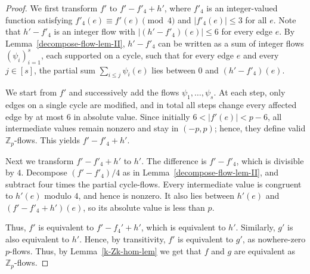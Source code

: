 \documentclass[a4paper,12pt]{article}
\theoremstyle{plain}
\theoremstyle{definition}
\newcommand{\Z}{\mathbb{Z}}
\renewcommand\le\leqslant
\begin{document}
\begin{proof}
We first transform $f'$ to $f'-f'_4+h'$, where $f'_4$ is an integer-valued function satisfying $f'_4(e)\equiv f'(e)\pmod 4$ and $|f'_4(e)|\le 3$ for all $e$. Note that $h'-f'_4$ is an integer flow with $|(h'-f'_4)(e)|\le 6$ for every edge $e$.
%
By Lemma~\ref{decompose-flow-lem-II}, $h'-f'_4$ can be written as a sum of integer flows $(\psi_i)_{i=1}^s$, each supported on a cycle, such that for every edge $e$ and every $j\in[s]$, the partial sum $\sum_{i\le j}\psi_i(e)$ lies between $0$ and $(h'-f'_4)(e)$.

We start from $f'$ and successively add the flows $\psi_1,\ldots,\psi_s$. At each step, only edges on a single cycle are modified, and in total all steps change every affected edge by at most $6$ in absolute value. Since initially $6<|f'(e)|<p-6$, all intermediate values remain nonzero and stay in $(-p,p)$; hence, they define valid $\mathbb{Z}_p$-flows. This yields $f'-f'_4+h'$.

Next we transform $f'-f'_4+h'$ to $h'$.  The difference is $f'-f'_4$, which is divisible by $4$.  Decompose $(f'-f'_4)/4$ as in Lemma~\ref{decompose-flow-lem-II}, and subtract four times the partial cycle-flows.  Every intermediate value is congruent to $h'(e)$ modulo $4$, and hence is nonzero.  It also lies between $h'(e)$ and $(f'-f'_4+h')(e)$, so its absolute value is less than $p$.

Thus, $f'$ is equivalent to $f'-f_4'+h'$, which is equivalent to $h'$.  Similarly, $g'$ is also equivalent to $h'$.  Hence, by transitivity, $f'$ is equivalent to $g'$, as nowhere-zero $p$-flows.  Thus, by Lemma~\ref{k-Zk-hom-lem} we get that $f$ and $g$ are equivalent as $\Z_p$-flows.
\end{proof}
\end{document}
